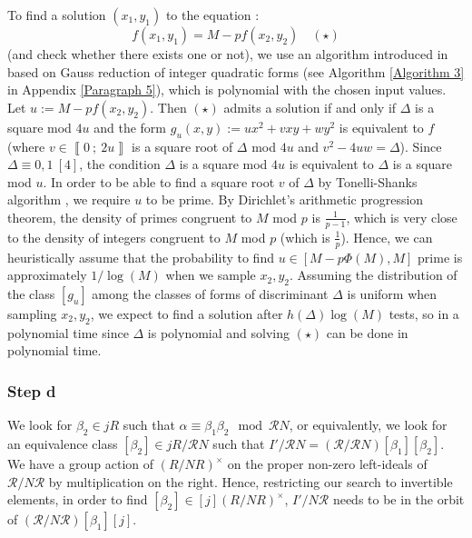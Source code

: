 \documentclass[a4paper,10pt,notitlepage]{report}
\theoremstyle{definition}
\theoremstyle{plain}
\theoremstyle{definition}
\newcommand{\m}[1]{\mathcal{#1}}
\renewcommand{\i}[2]{\left\llbracket #1~;~#2\right\rrbracket}
\renewcommand{\(}{\left(}
\renewcommand{\)}{\right)}
\begin{document}
To find a solution $(x_1,y_1)$ to the equation :
\[f(x_1,y_1)=M-pf(x_2,y_2)\quad (\star)\]
(and check whether there exists one or not), we use an algorithm introduced in \cite[§ 46, pp. 73-75]{Dickson} based on Gauss reduction of integer quadratic forms (see Algorithm \ref{Algorithm 3} in Appendix \ref{Paragraph 5}), which is polynomial with the chosen input values. Let $u:=M-pf(x_2,y_2)$. Then $(\star)$ admits a solution if and only if $\Delta$ is a square mod $4u$ and the form $g_u(x,y):=ux^2+vxy+wy^2$ is equivalent to $f$ (where $v\in\i{0}{2u}$ is a square root of $\Delta$ mod $4u$ and $v^2-4uw=\Delta$).  Since $\Delta\equiv 0, 1 \ [4]$,  the condition $\Delta$ is a square mod $4u$ is equivalent to $\Delta$ is a square mod $u$. In order to be able to find a square root $v$ of $\Delta$ by Tonelli-Shanks algorithm \cite[Algorithm 1.5.1]{Cohen1}, we require $u$ to be prime. By Dirichlet's arithmetic progression theorem, the density of primes congruent to $M$ mod $p$ is $\frac{1}{p-1}$, which is very close to the density of integers congruent to $M$ mod $p$ (which is $\frac{1}{p}$). Hence, we can heuristically assume that the probability to find $u\in [M-p\Phi(M),M]$ prime is approximately $1/\log(M)$ when we sample  $x_2,y_2$. Assuming the distribution of the class $[g_u]$ among the classes of forms of discriminant $\Delta$ is uniform when sampling $x_2,y_2$, we expect to find a solution after $h(\Delta)\log(M)$ tests, so in a polynomial time since $\Delta$ is polynomial and solving $(\star)$ can be done in polynomial time. 

\subsubsection{Step d}

We look for $\beta_2\in jR$ such that $\alpha\equiv\beta_1\beta_2 \mod \m{R}N$, or equivalently, we look for an equivalence class $[\beta_2]\in jR/\m{R}N$ such that $I'/\m{R}N=(\m{R}/\m{R}N)[\beta_1][\beta_2]$.  We have a group action of $(R/NR)^\times$ on the proper non-zero left-ideals of $\m{R}/N\m{R}$ by multiplication on the right. Hence, restricting our search to invertible elements, in order to find $[\beta_2]\in [j](R/NR)^\times $, $I'/N\m{R}$ needs to be in the orbit of $(\m{R}/N\m{R})[\beta_1][j]$.
\end{document}
